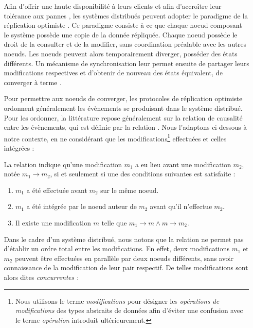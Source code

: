 \label{sec:etat-art-crdts-intro}

Afin d'offrir une haute disponibilité à leurs clients et afin d'accroître leur tolérance aux pannes \cite{2016-trade-offs-replicated-systems-guerraoui}, les systèmes distribués peuvent adopter le paradigme de la réplication optimiste \cite{2005-optimistic-replication-saito}.
Ce paradigme consiste à ce que chaque noeud composant le système possède une copie de la donnée répliquée.
Chaque noeud possède le droit de la consulter et de la modifier, sans coordination préalable avec les autres noeuds.
Les noeuds peuvent alors temporairement diverger, \ie posséder des états différents.
Un mécanisme de synchronisation leur permet ensuite de partager leurs modifications respectives et d'obtenir de nouveau des états équivalent, \ie de converger à terme \cite{10.1145/224057.224070}.

Pour permettre aux noeuds de converger, les protocoles de réplication optimiste ordonnent généralement les évènements se produisant dans le système distribué.
Pour les ordonner, la littérature repose généralement sur la relation de causalité entre les évènements, qui est définie par la relation \hb \cite{1978-happen-before-lamport}.
Nous l'adaptons ci-dessous à notre contexte, en ne considérant que les modifications\footnote{Nous utilisons le terme \emph{modifications} pour désigner les \emph{opérations de modifications} des types abstraits de données afin d'éviter une confusion avec le terme \emph{opération} introduit ultérieurement.} effectuées et celles intégrées :

\begin{definition}[Relation \hb]
  \label{def:happens-before}
  La relation \hb indique qu'une modification $m_1$ a eu lieu avant une modification $m_2$, notée $m_1 \rightarrow m_2$, si et seulement si une des conditions suivantes est satisfaite :
  \begin{enumerate}
    \item $m_1$ a été effectuée avant $m_2$ sur le même noeud.
    \item $m_1$ a été intégrée par le noeud auteur de $m_2$ avant qu'il n'effectue $m_2$.
    \item Il existe une modification $m$ telle que $m_1 \rightarrow m \land m \rightarrow m_2$.
  \end{enumerate}
\end{definition}

Dans le cadre d'un système distribué, nous notons que la relation \hb ne permet pas d'établir un ordre total entre les modifications.
En effet, deux modifications $m_1$ et $m_2$ peuvent être effectuées en parallèle par deux noeuds différents, sans avoir connaissance de la modification de leur pair respectif.
De telles modifications sont alors dites \emph{concurrentes} :

